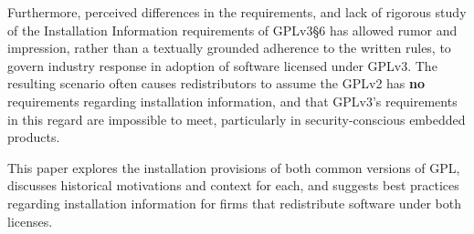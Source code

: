 Furthermore, perceived differences in the requirements, and lack of rigorous
study of the Installation Information requirements of GPLv3\S6 has allowed
rumor and impression, rather than a textually grounded adherence to the
written rules, to govern industry response in adoption of software licensed
under GPLv3.  The resulting scenario often causes redistributors to assume
the GPLv2 has \textbf{no} requirements regarding installation information,
and that GPLv3's requirements in this regard are impossible to meet,
particularly in security-conscious embedded products.

This paper explores the installation provisions of both common versions of
GPL, discusses historical motivations and context for each, and suggests best
practices regarding installation information for firms that redistribute
software under both licenses.


